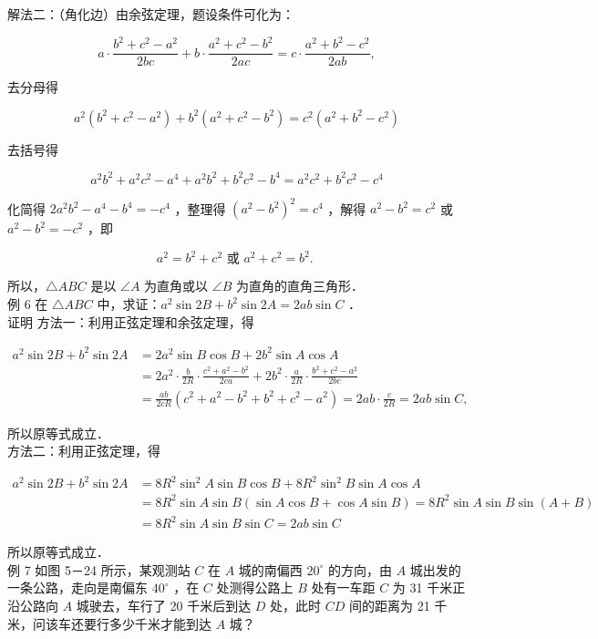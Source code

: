 \documentclass[10pt]{article}
\begin{document}
解法二：（角化边）由余弦定理，题设条件可化为：

\[
a \cdot \frac{b^{2}+c^{2}-a^{2}}{2 b c}+b \cdot \frac{a^{2}+c^{2}-b^{2}}{2 a c}=c \cdot \frac{a^{2}+b^{2}-c^{2}}{2 a b},
\]

去分母得

\[
a^{2}\left(b^{2}+c^{2}-a^{2}\right)+b^{2}\left(a^{2}+c^{2}-b^{2}\right)=c^{2}\left(a^{2}+b^{2}-c^{2}\right)
\]

去括号得

\[
a^{2} b^{2}+a^{2} c^{2}-a^{4}+a^{2} b^{2}+b^{2} c^{2}-b^{4}=a^{2} c^{2}+b^{2} c^{2}-c^{4}
\]

化简得 \(2 a^{2} b^{2}-a^{4}-b^{4}=-c^{4}\) ，整理得 \(\left(a^{2}-b^{2}\right)^{2}=c^{4}\) ，解得 \(a^{2}-b^{2}=c^{2}\) 或 \(a^{2}-b^{2}=-c^{2}\) ，即

\[
a^{2}=b^{2}+c^{2} \text { 或 } a^{2}+c^{2}=b^{2} \text {. }
\]

所以，\(\triangle A B C\) 是以 \(\angle A\) 为直角或以 \(\angle B\) 为直角的直角三角形．\\
例 6 在 \(\triangle A B C\) 中，求证：\(a^{2} \sin 2 B+b^{2} \sin 2 A=2 a b \sin C\) ．\\
证明 方法一：利用正弦定理和余弦定理，得

\[
\begin{aligned}
a^{2} \sin 2 B+b^{2} \sin 2 A & =2 a^{2} \sin B \cos B+2 b^{2} \sin A \cos A \\
& =2 a^{2} \cdot \frac{b}{2 R} \cdot \frac{c^{2}+a^{2}-b^{2}}{2 c a}+2 b^{2} \cdot \frac{a}{2 R} \cdot \frac{b^{2}+c^{2}-a^{2}}{2 b c} \\
& =\frac{a b}{2 c R}\left(c^{2}+a^{2}-b^{2}+b^{2}+c^{2}-a^{2}\right)=2 a b \cdot \frac{c}{2 R}=2 a b \sin C,
\end{aligned}
\]

所以原等式成立．\\
方法二：利用正弦定理，得

\[
\begin{aligned}
a^{2} \sin 2 B+b^{2} \sin 2 A & =8 R^{2} \sin ^{2} A \sin B \cos B+8 R^{2} \sin ^{2} B \sin A \cos A \\
& =8 R^{2} \sin A \sin B(\sin A \cos B+\cos A \sin B)=8 R^{2} \sin A \sin B \sin (A+B) \\
& =8 R^{2} \sin A \sin B \sin C=2 a b \sin C
\end{aligned}
\]

所以原等式成立．\\
例 7 如图 5－24 所示，某观测站 \(C\) 在 \(A\) 城的南偏西 \(20^{\circ}\) 的方向，由 \(A\) 城出发的一条公路，走向是南偏东 \(40^{\circ}\) ，在 \(C\) 处测得公路上 \(B\) 处有一车距 \(C\) 为 31 千米正沿公路向 \(A\) 城驶去，车行了 20 千米后到达 \(D\) 处，此时 \(C D\) 间的距离为 21 千米，问该车还要行多少千米才能到达 \(A\) 城？
\end{document}
